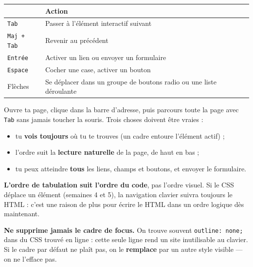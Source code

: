 \documentclass[a4paper,11pt]{article}
\newcommand{\hdr}[1]{\multicolumn{1}{l}{\color{white}\bfseries #1}}
\renewcommand{\arraystretch}{1.3}
\begin{document}
\begin{center}
\renewcommand{\arraystretch}{1.0}
\begin{tabularx}{\linewidth}{p{3cm}X}
  \toprule
  \rowcolor{uniNavy}
  \hdr{Touche} & \hdr{Action} \\
  \midrule
  \rowcolor{uniPaper}
  \texttt{Tab} & Passer à l'élément interactif suivant \\
  \texttt{Maj + Tab} & Revenir au précédent \\
  \rowcolor{uniPaper}
  \texttt{Entrée} & Activer un lien ou envoyer un formulaire \\
  \texttt{Espace} & Cocher une case, activer un bouton \\
  \rowcolor{uniPaper}
  Flèches & Se déplacer dans un groupe de boutons radio ou une liste déroulante \\
  \bottomrule
\end{tabularx}
\end{center}

\begin{tcolorbox}[astuce, title={Le test des trente secondes}]
Ouvre ta page, clique dans la barre d'adresse, puis parcours toute la page avec \texttt{Tab} sans jamais toucher la souris. Trois choses doivent être vraies :

\begin{itemize}
  \item tu \textbf{vois toujours} où tu te trouves (un cadre entoure l'élément actif) ;
  \item l'ordre suit la \textbf{lecture naturelle} de la page, de haut en bas ;
  \item tu peux atteindre \textbf{tous} les liens, champs et boutons, et envoyer le formulaire.
\end{itemize}
\end{tcolorbox}

\begin{tcolorbox}[attention, title={Deux règles à retenir pour la suite}]
\textbf{L'ordre de tabulation suit l'ordre du code}, pas l'ordre visuel. Si le CSS déplace un élément (semaines 4 et 5), la navigation clavier suivra toujours le HTML : c'est une raison de plus pour écrire le HTML dans un ordre logique dès maintenant.

\vspace{4pt}
\textbf{Ne supprime jamais le cadre de focus.} On trouve souvent \texttt{outline: none;} dans du CSS trouvé en ligne : cette seule ligne rend un site inutilisable au clavier. Si le cadre par défaut ne plaît pas, on le \textbf{remplace} par un autre style visible --- on ne l'efface pas.
\end{tcolorbox}
\end{document}
